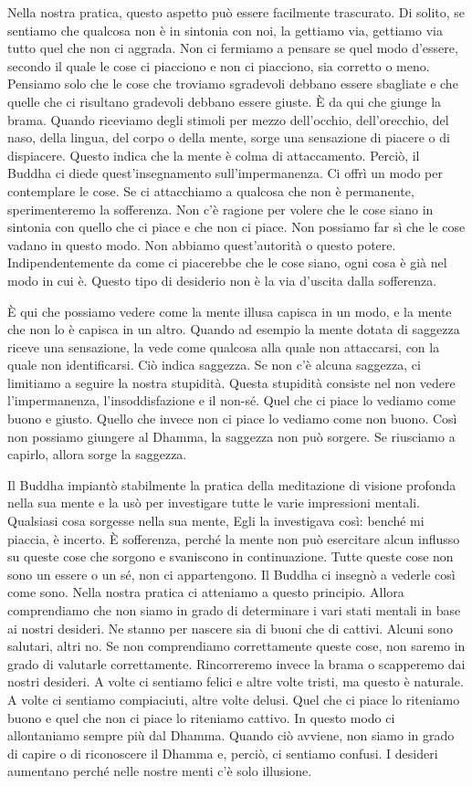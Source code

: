 Nella nostra pratica, questo aspetto può essere facilmente trascurato.
Di solito, se sentiamo che qualcosa non è in sintonia con noi, la
gettiamo via, gettiamo via tutto quel che non ci aggrada. Non ci
fermiamo a pensare se quel modo d'essere, secondo il quale le cose ci
piacciono e non ci piacciono, sia corretto o meno. Pensiamo solo che le
cose che troviamo sgradevoli debbano essere sbagliate e che quelle che
ci risultano gradevoli debbano essere giuste. È da qui che giunge la
brama. Quando riceviamo degli stimoli per mezzo dell'occhio,
dell'orecchio, del naso, della lingua, del corpo o della mente, sorge
una sensazione di piacere o di dispiacere. Questo indica che la mente è
colma di attaccamento. Perciò, il Buddha ci diede quest'insegnamento
sull'impermanenza. Ci offrì un modo per contemplare le cose. Se ci
attacchiamo a qualcosa che non è permanente, sperimenteremo la
sofferenza. Non c'è ragione per volere che le cose siano in sintonia con
quello che ci piace e che non ci piace. Non possiamo far sì che le cose
vadano in questo modo. Non abbiamo quest'autorità o questo potere.
Indipendentemente da come ci piacerebbe che le cose siano, ogni cosa è
già nel modo in cui è. Questo tipo di desiderio non è la via d'uscita
dalla sofferenza.

È qui che possiamo vedere come la mente illusa capisca in un modo, e la
mente che non lo è capisca in un altro. Quando ad esempio la mente
dotata di saggezza riceve una sensazione, la vede come qualcosa alla
quale non attaccarsi, con la quale non identificarsi. Ciò indica
saggezza. Se non c'è alcuna saggezza, ci limitiamo a seguire la nostra
stupidità. Questa stupidità consiste nel non vedere l'impermanenza,
l'insoddisfazione e il non-sé. Quel che ci piace lo vediamo come buono e
giusto. Quello che invece non ci piace lo vediamo come non buono. Così
non possiamo giungere al Dhamma, la saggezza non può sorgere. Se
riusciamo a capirlo, allora sorge la saggezza.

Il Buddha impiantò stabilmente la pratica della meditazione di visione
profonda nella sua mente e la usò per investigare tutte le varie
impressioni mentali. Qualsiasi cosa sorgesse nella sua mente, Egli la
investigava così: benché mi piaccia, è incerto. È sofferenza, perché la
mente non può esercitare alcun influsso su queste cose che sorgono e
svaniscono in continuazione. Tutte queste cose non sono un essere o un
sé, non ci appartengono. Il Buddha ci insegnò a vederle così come sono.
Nella nostra pratica ci atteniamo a questo principio. Allora
comprendiamo che non siamo in grado di determinare i vari stati mentali
in base ai nostri desideri. Ne stanno per nascere sia di buoni che di
cattivi. Alcuni sono salutari, altri no. Se non comprendiamo
correttamente queste cose, non saremo in grado di valutarle
correttamente. Rincorreremo invece la brama o scapperemo dai nostri
desideri. A volte ci sentiamo felici e altre volte tristi, ma questo è
naturale. A volte ci sentiamo compiaciuti, altre volte delusi. Quel che
ci piace lo riteniamo buono e quel che non ci piace lo riteniamo
cattivo. In questo modo ci allontaniamo sempre più dal Dhamma. Quando
ciò avviene, non siamo in grado di capire o di riconoscere il Dhamma e,
perciò, ci sentiamo confusi. I desideri aumentano perché nelle nostre
menti c'è solo illusione.

